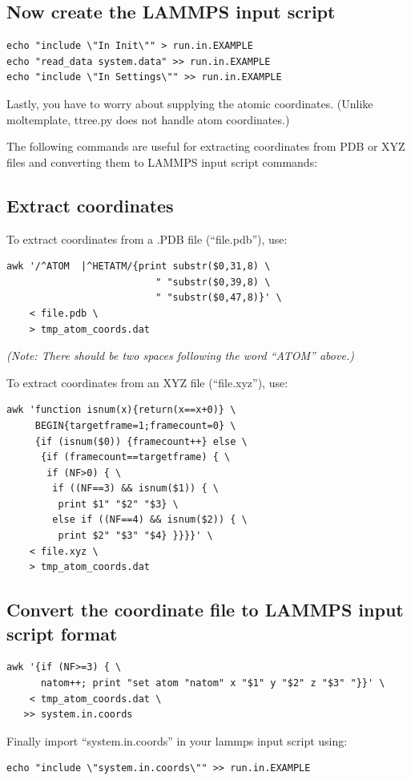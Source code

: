 \documentclass[11pt]{article}
\begin{document}
\subsection{Now create the LAMMPS input script}

\begin{verbatim}
echo "include \"In Init\"" > run.in.EXAMPLE
echo "read_data system.data" >> run.in.EXAMPLE
echo "include \"In Settings\"" >> run.in.EXAMPLE
\end{verbatim}
Lastly, you have to worry about supplying the atomic coordinates.
(Unlike moltemplate, ttree.py does not handle atom coordinates.)

The following commands are useful for extracting coordinates from PDB or XYZ
files and converting them to LAMMPS input script commands:

\subsection{Extract coordinates}
To extract coordinates from a .PDB file (``file.pdb''), use:

\begin{verbatim}
awk '/^ATOM  |^HETATM/{print substr($0,31,8) \
                          " "substr($0,39,8) \
                          " "substr($0,47,8)}' \
    < file.pdb \
    > tmp_atom_coords.dat
\end{verbatim}
\textit{(Note: There should be two spaces following the word ``ATOM'' above.)}


To extract coordinates from an XYZ file (``file.xyz''), use:
\begin{verbatim}
awk 'function isnum(x){return(x==x+0)} \
     BEGIN{targetframe=1;framecount=0} \
     {if (isnum($0)) {framecount++} else \
      {if (framecount==targetframe) { \
       if (NF>0) { \
        if ((NF==3) && isnum($1)) { \
         print $1" "$2" "$3} \
        else if ((NF==4) && isnum($2)) { \
         print $2" "$3" "$4} }}}}' \
    < file.xyz \
    > tmp_atom_coords.dat
\end{verbatim}

\subsection{Convert the coordinate file to LAMMPS input script format}

\begin{verbatim}
awk '{if (NF>=3) { \
      natom++; print "set atom "natom" x "$1" y "$2" z "$3" "}}' \
    < tmp_atom_coords.dat \
   >> system.in.coords
\end{verbatim}
Finally import ``system.in.coords'' in your lammps input script using:
\begin{verbatim}
echo "include \"system.in.coords\"" >> run.in.EXAMPLE
\end{verbatim}
\end{document}
